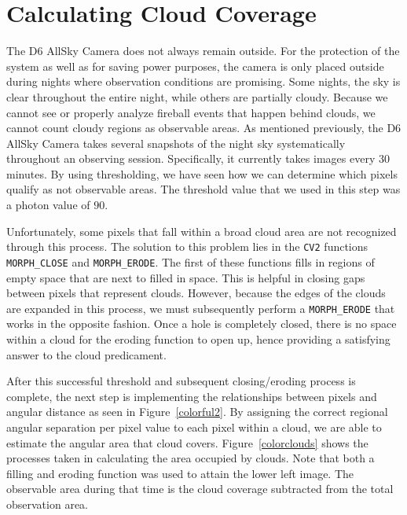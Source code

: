 \section{Calculating Cloud Coverage}

The D6 AllSky Camera does not always remain outside.
For the protection of the system as well as for saving power purposes, the camera is only placed outside during nights where observation conditions are promising.
Some nights, the sky is clear throughout the entire night, while others are partially cloudy.
Because we cannot see or properly analyze fireball events that happen behind clouds, we cannot count cloudy regions as observable areas.
As mentioned previously, the D6 AllSky Camera takes several snapshots of the night sky systematically throughout an observing session.
Specifically, it currently takes images every $30$ minutes.
By using thresholding, we have seen how we can determine which pixels qualify as not observable areas.
The threshold value that we used in this step was a photon value of $90$.

Unfortunately, some pixels that fall within a broad cloud area are not recognized through this process.
The solution to this problem lies in the \texttt{CV2} functions \texttt{MORPH\_CLOSE} and \texttt{MORPH\_ERODE}.
The first of these functions fills in regions of empty space that are next to filled in space.
This is helpful in closing gaps between pixels that represent clouds.
However, because the edges of the clouds are expanded in this process, we must subsequently perform a \texttt{MORPH\_ERODE} that works in the opposite fashion.
Once a hole is completely closed, there is no space within a cloud for the eroding function to open up, hence providing a satisfying answer to the cloud predicament.

After this successful threshold and subsequent closing/eroding process is complete, the next step is implementing the relationships between pixels and angular distance as seen in Figure~\ref{colorful2}.
By assigning the correct regional angular separation per pixel value to each pixel within a cloud, we are able to estimate the angular area that cloud covers.
Figure~\ref{colorclouds} shows the processes taken in calculating the area occupied by clouds.
Note that both a filling and eroding function was used to attain the lower left image.
The observable area during that time is the cloud coverage subtracted from the total observation area.


